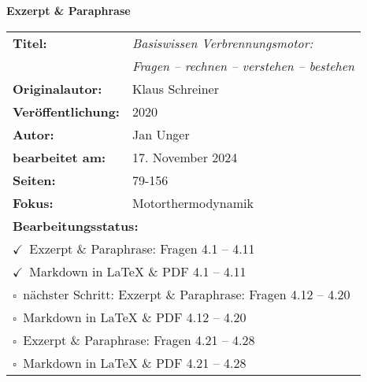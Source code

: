 \documentclass[a4paper,12pt]{article}
\newcommand{\checkbox}{$\square$}
\newcommand{\checkedbox}{$\checkmark$}
\begin{document}
\thispagestyle{empty}

\begin{center}
    {\huge\sffamily\bfseries Exzerpt \& Paraphrase\par}
    
    \vspace{2.5cm}
    
    \begin{tabular}{ll}
        \textbf{Titel:} & \textit{Basiswissen Verbrennungsmotor:} \\
        & \textit{Fragen -- rechnen -- verstehen -- bestehen} \\[0.5cm]
        \textbf{Originalautor:} & Klaus Schreiner \\[0.5cm]
        \textbf{Veröffentlichung:} & 2020 \\[0.5cm]
        \textbf{Autor:} & Jan Unger \\[0.5cm]
        \textbf{bearbeitet am:} & 17. November 2024 \\[0.5cm]
        \textbf{Seiten:} & 79-156 \\[0.5cm]
        \textbf{Fokus:} & Motorthermodynamik \\[0.5cm]
        \multicolumn{2}{l}{\textbf{Bearbeitungsstatus:}} \\[0.2cm]
        \multicolumn{2}{l}{\checkedbox~Exzerpt \& Paraphrase: Fragen 4.1 -- 4.11} \\
        \multicolumn{2}{l}{\checkedbox~Markdown in LaTeX \& PDF 4.1 -- 4.11} \\
        \multicolumn{2}{l}{\checkbox~nächster Schritt: Exzerpt \& Paraphrase: Fragen 4.12 -- 4.20} \\
        \multicolumn{2}{l}{\checkbox~Markdown in LaTeX \& PDF 4.12 -- 4.20} \\
        \multicolumn{2}{l}{\checkbox~Exzerpt \& Paraphrase: Fragen 4.21 -- 4.28} \\
        \multicolumn{2}{l}{\checkbox~Markdown in LaTeX \& PDF 4.21 -- 4.28}
    \end{tabular}
\end{center}

\newpage
\tableofcontents
\newpage

\end{document}
